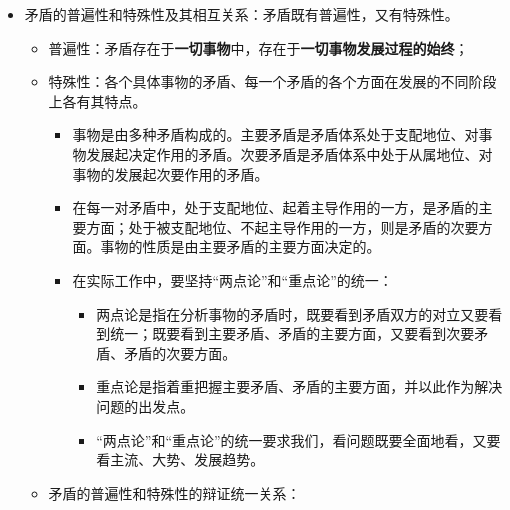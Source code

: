 \documentclass[
]{article}
\begin{document}
\begin{itemize}
\begin{itemize}
    \begin{itemize}
    \item
      矛盾双方的斗争促进矛盾双方力量的变化，造成双方力量发展的不平衡，为对立面的转化、事物的质变创造条件；
    \item
      \textbf{矛盾双方的斗争是一种矛盾统一体向另一种矛盾统一体过渡的决定性力量}。
    \end{itemize}
  \item
    在事物发展过程中，矛盾的同一性和斗争性相互结合，共同发生作用，但在不同条件下，二者所处的地位会有所不同。在一定的条件下，矛盾的斗争性可能处于主要方面，而在另外的条件下，矛盾的同一性又可能处于主要方面。
  \item
    矛盾同一性和斗争性的辩证关系原理，要求我们在观察和处理问题时，必须善于把两者结合起来，在斗争性中把握同一性，在同一性中把握斗争性。和谐是矛盾的一种特殊表现形式，体现着矛盾双方的相互依存、相互存进、共同发展。\textbf{和谐是相对的、有条件的，并不意味着矛盾的绝对同一}。
  \end{itemize}
\item
  矛盾的普遍性和特殊性及其相互关系：矛盾既有普遍性，又有特殊性。

  \begin{itemize}
  \item
    普遍性：矛盾存在于\textbf{一切事物}中，存在于\textbf{一切事物发展过程的始终}；
  \item
    特殊性：各个具体事物的矛盾、每一个矛盾的各个方面在发展的不同阶段上各有其特点。

    \begin{itemize}
    \item
      事物是由多种矛盾构成的。主要矛盾是矛盾体系处于支配地位、对事物发展起决定作用的矛盾。次要矛盾是矛盾体系中处于从属地位、对事物的发展起次要作用的矛盾。
    \item
      在每一对矛盾中，处于支配地位、起着主导作用的一方，是矛盾的主要方面；处于被支配地位、不起主导作用的一方，则是矛盾的次要方面。事物的性质是由主要矛盾的主要方面决定的。
    \item
      在实际工作中，要坚持``两点论''和``重点论''的统一：

      \begin{itemize}
      \item
        两点论是指在分析事物的矛盾时，既要看到矛盾双方的对立又要看到统一；既要看到主要矛盾、矛盾的主要方面，又要看到次要矛盾、矛盾的次要方面。
      \item
        重点论是指着重把握主要矛盾、矛盾的主要方面，并以此作为解决问题的出发点。
      \item
        ``两点论''和``重点论''的统一要求我们，看问题既要全面地看，又要看主流、大势、发展趋势。
      \end{itemize}
    \end{itemize}
  \item
    矛盾的普遍性和特殊性的辩证统一关系：


\end{itemize}
\end{itemize}
\end{document}
